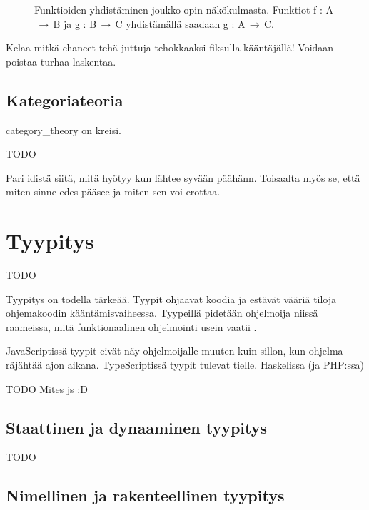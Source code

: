 \begin{figure}[htbp]
	\caption{Funktioiden yhdistäminen joukko-opin näkökulmasta. Funktiot f : A$\,\to\,$B ja g : B$\,\to\,$C yhdistämällä saadaan g : A$\,\to\,$C.}
\end{figure}


Kelaa mitkä chancet tehä juttuja tehokkaaksi fiksulla kääntäjällä! Voidaan poistaa turhaa laskentaa.

\subsection{Kategoriateoria}

\Gls{category_theory} on kreisi.

TODO

Pari idistä siitä, mitä hyötyy kun lähtee syvään päähänn. Toisaalta myös se, että miten sinne edes pääsee ja miten sen voi erottaa.


\section{Tyypitys}

TODO

Tyypitys on todella tärkeää. Tyypit ohjaavat koodia ja estävät vääriä tiloja ohjemakoodin kääntämisvaiheessa. Tyypeillä pidetään ohjelmoija niissä raameissa, mitä funktionaalinen ohjelmointi usein vaatii \cite[44]{cantarella_fp_haitat}.

JavaScriptissä tyypit eivät näy ohjelmoijalle muuten kuin sillon, kun ohjelma räjähtää ajon aikana. TypeScriptissä tyypit tulevat tielle. Haskelissa (ja PHP:ssa)

TODO Mites \gls{js} :D

\subsection{Staattinen ja dynaaminen tyypitys}

TODO

\subsection{Nimellinen ja rakenteellinen tyypitys}


